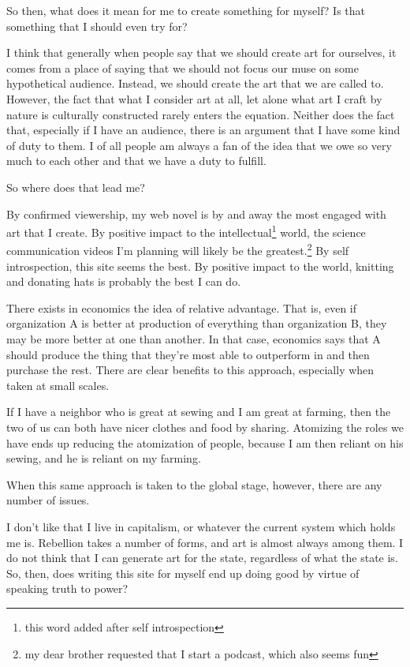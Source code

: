 \documentclass[12pt]{article}
\renewcommand{\,}{\textsuperscript{,}}
\begin{document}
So then, what does it mean for me to create something for myself?  
Is that something that I should even try for?

I think that generally when people say that we should create art for ourselves, it comes from a place of saying that we should not focus our muse on some hypothetical audience.  
Instead, we should create the art that we are called to.  
However, the fact that what I consider art at all, let alone what art I craft by nature is culturally constructed rarely enters the equation.  
Neither does the fact that, especially if I have an audience, there is an argument that I have some kind of duty to them.  
I of all people am always a fan of the idea that we owe so very much to each other and that we have a duty to fulfill.

So where does that lead me?

By confirmed viewership, my web novel is by and away the most engaged with art that I create.  
By positive impact to the intellectual\footnote{this word added after self introspection} world, the science communication videos I'm planning will likely be the greatest.\footnote{my dear brother requested that I start a podcast, which also seems fun}  
By self introspection, this site seems the best.  
By positive impact to the world, knitting and donating hats is probably the best I can do.

There exists in economics the idea of relative advantage.  
That is, even if organization A is better at production of everything than organization B, they may be more better at one than another.  
In that case, economics says that A should produce the thing that they're most able to outperform in and then purchase the rest.  
There are clear benefits to this approach, especially when taken at small scales.

If I have a neighbor who is great at sewing and I am great at farming, then the two of us can both have nicer clothes and food by sharing.  
Atomizing the roles we have ends up reducing the atomization of people, because I am then reliant on his sewing, and he is reliant on my farming.

When this same approach is taken to the global stage, however, there are any number of issues.

I don't like that I live in capitalism, or whatever the current system which holds me is.  
Rebellion takes a number of forms, and art is almost always among them.  
I do not think that I can generate art for the state, regardless of what the state is.  
So, then, does writing this site for myself end up doing good by virtue of speaking truth to power?
\end{document}
